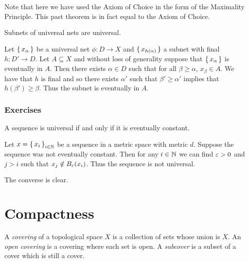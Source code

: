 \documentclass[letterpaper, 11pt, oneside]{book}
\begin{document}
Note that here we have used the Axiom of Choice in the form of the Maximality Principle.
This past theorem is in fact equal to the Axiom of Choice.

\begin{prop}
  Subnets of universal nets are universal.
\end{prop}
\begin{pf}
  Let $\set{x_{\alpha}}$ be a universal net $\phi\colon D \to X$ and $\set{x_{h(\alpha)}}$ a subnet with final $h\colon D' \to D$.
  Let $A \subseteq X$ and without loss of generality suppose that $\set{x_{\alpha}}$ is eventually in $A$.
  Then there exists $\alpha \in D$ such that for all $\beta \geq \alpha$, $x_{\beta} \in A$.
  We have that $h$ is final and so there exists $\alpha'$ such that $\beta' \geq \alpha'$ implies that $h(\beta') \geq \beta$.
  Thus the subnet is eventually in $A$.
\end{pf}

\clearpage

\subsection*{Exercises}

\begin{exercise}
  A sequence is universal if and only if it is eventually constant.
\end{exercise}
\begin{pf}
  Let $x = \set{x_{i}}_{i \in \mathbb{N}}$ be a sequence in a metric space with metric $d$.
  Suppose the sequence was not eventually constant.
  Then for any $i \in \mathbb{N}$ we can find $\varepsilon > 0$ and $j > i$ such that $x_{j} \notin B_{\varepsilon}(x_{i})$.
  Thus the sequence is not universal.

  The converse is clear.
\end{pf}

\clearpage

\chapter{Compactness}

\begin{defn}
  A \emph{covering} of a topological space $X$ is a collection of sets whose union is $X$.
  An \emph{open covering} is a covering where each set is open.
  A \emph{subcover} is a subset of a cover which is still a cover.
\end{defn}
\end{document}
